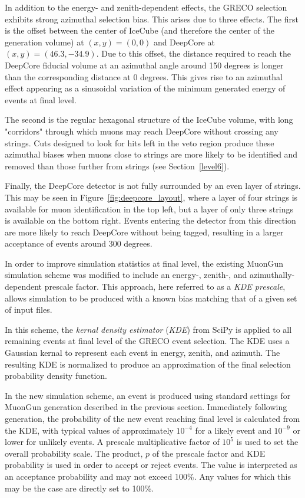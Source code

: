 In addition to the energy- and zenith-dependent effects, the GRECO selection exhibits strong azimuthal selection bias.
This arises due to three effects. 
The first is the offset between the center of IceCube (and therefore the center of the generation volume) at $(x,y)=(0,0)$ and DeepCore at $(x,y)=(46.3, -34.9)$.
Due to this offset, the distance required to reach the DeepCore fiducial volume at an azimuthal angle around 150 degrees is longer than the corresponding distance at 0 degrees.
This gives rise to an azimuthal effect appearing as a sinusoidal variation of the minimum generated energy of events at final level.

The second is the regular hexagonal structure of the IceCube volume, with long "corridors" through which muons may reach DeepCore without crossing any strings.
Cuts designed to look for hits left in the veto region produce these azimuthal biases when muons close to strings are more likely to be identified and removed than those further from strings (see Section~\ref{level6}).

Finally, the DeepCore detector is not fully surrounded by an even layer of strings.
This may be seen in Figure~\ref{fig:deepcore_layout}, where a layer of four strings is available for muon identification in the top left, but a layer of only three strings is available on the bottom right.
Events entering the detector from this direction are more likely to reach DeepCore without being tagged, resulting in a larger acceptance of events around 300 degrees.

In order to improve simulation statistics at final level, the existing MuonGun simulation scheme was modified to include an energy-, zenith-, and azimuthally-dependent prescale factor.
This approach, here referred to as a \emph{KDE prescale}, allows simulation to be produced with a known bias matching that of a given set of input files.

In this scheme, the \emph{kernal density estimator} (\emph{KDE}) from SciPy \cite{scipy} is applied to all remaining events at final level of the GRECO event selection. 
The KDE uses a Gaussian kernal to represent each event in energy, zenith, and azimuth. 
The resulting KDE is normalized to produce an approximation of the final selection probability density function.

In the new simulation scheme, an event is produced using standard settings for MuonGun generation described in the previous section.
Immediately following generation, the probability of the new event reaching final level is calculated from the KDE, with typical values 
of approximately $10^{-4}$ for a likely event and $10^{-9}$ or lower for unlikely events.
A prescale multiplicative factor of $10^5$ is used to set the overall probability scale.
The product, $p$ of the prescale factor and KDE probability is used in order to accept or reject events.
The value is interpreted as an acceptance probability and may not exceed 100\%.
Any values for which this may be the case are directly set to 100\%.

